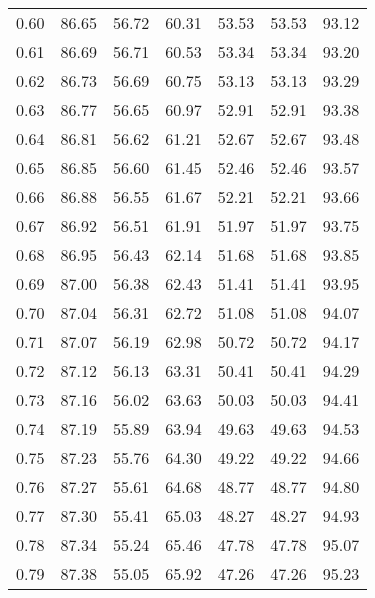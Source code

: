 \begin{tabular}{|c|c|c|c|c|c|c|}
      0.60 &     86.65 &     56.72 &      60.31 &   53.53 &      53.53 &         93.12 \\
      0.61 &     86.69 &     56.71 &      60.53 &   53.34 &      53.34 &         93.20 \\
      0.62 &     86.73 &     56.69 &      60.75 &   53.13 &      53.13 &         93.29 \\
      0.63 &     86.77 &     56.65 &      60.97 &   52.91 &      52.91 &         93.38 \\
      0.64 &     86.81 &     56.62 &      61.21 &   52.67 &      52.67 &         93.48 \\
      0.65 &     86.85 &     56.60 &      61.45 &   52.46 &      52.46 &         93.57 \\
      0.66 &     86.88 &     56.55 &      61.67 &   52.21 &      52.21 &         93.66 \\
      0.67 &     86.92 &     56.51 &      61.91 &   51.97 &      51.97 &         93.75 \\
      0.68 &     86.95 &     56.43 &      62.14 &   51.68 &      51.68 &         93.85 \\
      0.69 &     87.00 &     56.38 &      62.43 &   51.41 &      51.41 &         93.95 \\
      0.70 &     87.04 &     56.31 &      62.72 &   51.08 &      51.08 &         94.07 \\
      0.71 &     87.07 &     56.19 &      62.98 &   50.72 &      50.72 &         94.17 \\
      0.72 &     87.12 &     56.13 &      63.31 &   50.41 &      50.41 &         94.29 \\
      0.73 &     87.16 &     56.02 &      63.63 &   50.03 &      50.03 &         94.41 \\
      0.74 &     87.19 &     55.89 &      63.94 &   49.63 &      49.63 &         94.53 \\
      0.75 &     87.23 &     55.76 &      64.30 &   49.22 &      49.22 &         94.66 \\
      0.76 &     87.27 &     55.61 &      64.68 &   48.77 &      48.77 &         94.80 \\
      0.77 &     87.30 &     55.41 &      65.03 &   48.27 &      48.27 &         94.93 \\
      0.78 &     87.34 &     55.24 &      65.46 &   47.78 &      47.78 &         95.07 \\
      0.79 &     87.38 &     55.05 &      65.92 &   47.26 &      47.26 &         95.23 \\

\end{tabular}
